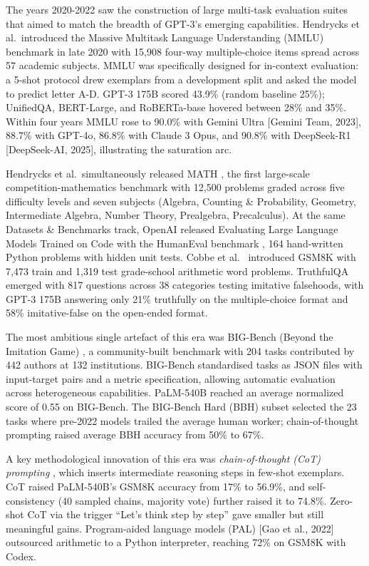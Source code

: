 \documentclass{article}
\begin{document}
The years 2020-2022 saw the construction of large multi-task evaluation suites that aimed to match the breadth of GPT-3's emerging capabilities. Hendrycks et al.~introduced the Massive Multitask Language Understanding (MMLU) benchmark \cite{hendrycks2021measuringmassivemu} in late 2020 with 15,908 four-way multiple-choice items spread across 57 academic subjects. MMLU was specifically designed for in-context evaluation: a 5-shot protocol drew exemplars from a development split and asked the model to predict letter A-D. GPT-3 175B scored 43.9\% (random baseline 25\%); UnifiedQA, BERT-Large, and RoBERTa-base hovered between 28\% and 35\%. Within four years MMLU rose to 90.0\% with Gemini Ultra {[}Gemini Team, 2023{]}, 88.7\% with GPT-4o, 86.8\% with Claude 3 Opus, and 90.8\% with DeepSeek-R1 {[}DeepSeek-AI, 2025{]}, illustrating the saturation arc.

Hendrycks et al.~simultaneously released MATH \cite{hendrycks2021measuringmassivemu}, the first large-scale competition-mathematics benchmark with 12,500 problems graded across five difficulty levels and seven subjects (Algebra, Counting \& Probability, Geometry, Intermediate Algebra, Number Theory, Prealgebra, Precalculus). At the same Datasets \& Benchmarks track, OpenAI released Evaluating Large Language Models Trained on Code with the HumanEval benchmark \cite{chen20212021}, 164 hand-written Python problems with hidden unit tests. Cobbe et al.~\cite{cobbe20212021} introduced GSM8K with 7,473 train and 1,319 test grade-school arithmetic word problems. TruthfulQA \cite{lin2022truthfulqameasurin} emerged with 817 questions across 38 categories testing imitative falsehoods, with GPT-3 175B answering only 21\% truthfully on the multiple-choice format and 58\% imitative-false on the open-ended format.

The most ambitious single artefact of this era was BIG-Bench (Beyond the Imitation Game) \cite{srivastava20222022}, a community-built benchmark with 204 tasks contributed by 442 authors at 132 institutions. BIG-Bench standardised tasks as JSON files with input-target pairs and a metric specification, allowing automatic evaluation across heterogeneous capabilities. PaLM-540B reached an average normalized score of 0.55 on BIG-Bench. The BIG-Bench Hard (BBH) subset \cite{suzgun2022challengingbigbenc} selected the 23 tasks where pre-2022 models trailed the average human worker; chain-of-thought prompting raised average BBH accuracy from 50\% to 67\%.

A key methodological innovation of this era was \emph{chain-of-thought (CoT) prompting} \cite{wei2022emergentabilitieso}, which inserts intermediate reasoning steps in few-shot exemplars. CoT raised PaLM-540B's GSM8K accuracy from 17\% to 56.9\%, and self-consistency (40 sampled chains, majority vote) \cite{wang20232023} further raised it to 74.8\%. Zero-shot CoT via the trigger ``Let's think step by step'' \cite{kojima2022largelanguagemodel} gave smaller but still meaningful gains. Program-aided language models (PAL) {[}Gao et al., 2022{]} outsourced arithmetic to a Python interpreter, reaching 72\% on GSM8K with Codex.
\end{document}
